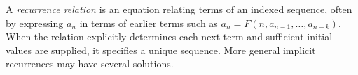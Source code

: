 
A \emph{recurrence relation} is an equation relating terms of an indexed sequence, often by expressing $a_n$ in terms of earlier terms such as $a_n=F(n,a_{n-1},\ldots,a_{n-k})$. When the relation explicitly determines each next term and sufficient initial values are supplied, it specifies a unique sequence. More general implicit recurrences may have several solutions.
